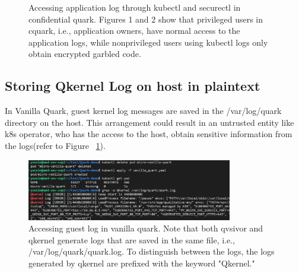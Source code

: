 \begin{figure}[H]

    
    
    \caption[Accessing application log through kubectl and securectl in confidential quark]{Accessing application log through kubectl and securectl in confidential quark. Figures 1 and 2 show that privileged users in cquark, i.e., 
    application owners, have normal access to the application logs, while non\-privileged users using kubectl logs only obtain encrypted garbled code.}
\end{figure}
\subsection{Storing Qkernel Log on host in plaintext}
In Vanilla Quark, guest kernel log messages are saved in the /var/log/quark directory on the host.  This arrangement could result in an untrusted entity like k8s operator, who has the access to the host,  obtain sensitive information from the logs(refer to Figure ~\ref{fig:vanilla_qkernel_Log}).
\begin{figure}[H]
    \centering
    \includegraphics[width=0.8\textwidth]{images/vanilla_qkernel_Log.png}
    \caption[Accessing guest kernel log in vanilla quark]{Accessing guest log in vanilla quark. Note that both qvsivor and qkernel generate logs that are saved in the same file, i.e., /var/log/quark/quark.log. To distinguish between the logs, the logs generated by qkernel are prefixed with the keyword "Qkernel."}
    \label{fig:vanilla_qkernel_Log}
\end{figure}


